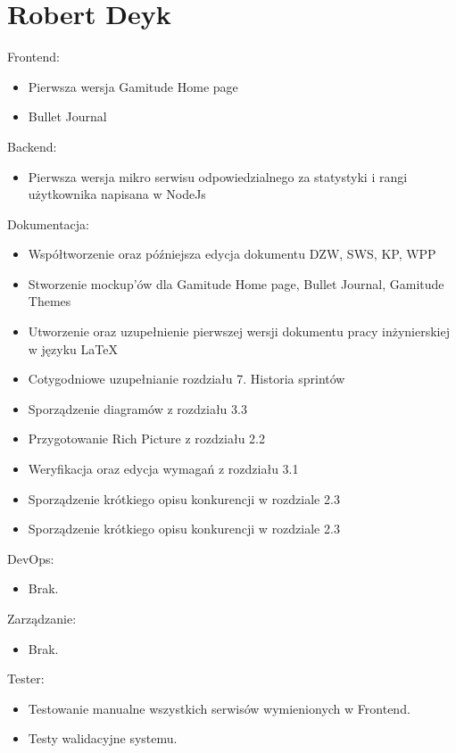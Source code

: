 \documentclass[a4paper,11pt]{report}
\begin{document}
\section {Robert Deyk}
Frontend:
\begin{itemize}
	\item Pierwsza wersja Gamitude Home page
	\item Bullet Journal
\end{itemize}
Backend:
\begin{itemize}
	\item Pierwsza wersja mikro serwisu odpowiedzialnego za statystyki i rangi użytkownika napisana w NodeJs
\end{itemize}
Dokumentacja:
\begin{itemize}
	\item Współtworzenie oraz późniejsza edycja dokumentu DZW, SWS, KP, WPP
	\item Stworzenie mockup'ów dla Gamitude Home page, Bullet Journal, Gamitude Themes
	\item Utworzenie oraz uzupełnienie pierwszej wersji dokumentu pracy inżynierskiej w języku LaTeX
	\item Cotygodniowe uzupełnianie rozdziału 7. Historia sprintów
	\item Sporządzenie diagramów z rozdziału 3.3
	\item Przygotowanie Rich Picture z rozdziału 2.2
	\item Weryfikacja oraz edycja wymagań z rozdziału 3.1
	\item Sporządzenie krótkiego opisu konkurencji w rozdziale 2.3
	\item Sporządzenie krótkiego opisu konkurencji w rozdziale 2.3
\end{itemize}
DevOps:
\begin{itemize}
	\item Brak.
\end{itemize}
Zarządzanie:
\begin{itemize}
	\item Brak.
\end{itemize}
Tester:
\begin{itemize}
	\item Testowanie manualne wszystkich serwisów wymienionych w Frontend.
	\item Testy walidacyjne systemu.
\end{itemize}
\end{document}
